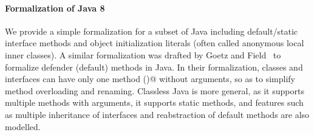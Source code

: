 \paragraph{Formalization of Java 8}
We provide a simple formalization for a subset of Java including
default/static interface methods and object initialization literals
(often called anonymous local inner classes).  A similar formalization
was drafted by Goetz and Field~\cite{goetz12fdefenders} to formalize
defender (default) methods in Java. In their formalization, classes
and interfaces can have only one method \Q@m()@ without arguments, so
as to simplify method overloading and renaming. Classless Java is more
general, as it supports multiple methods with arguments, it supports
static methods, and features such as multiple inheritance of
interfaces and reabstraction of default methods are also modelled.
